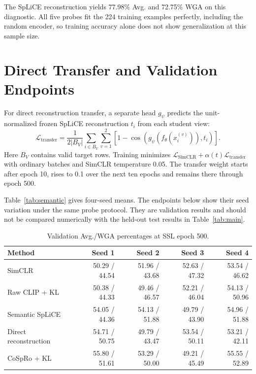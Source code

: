 \documentclass{article}
\begin{document}
The SpLiCE reconstruction yields 77.98\% Avg. and 72.75\% WGA on this diagnostic. All five probes fit the 224 training examples perfectly, including the random encoder, so training accuracy alone does not show generalization at this sample size.

\section{Direct Transfer and Validation Endpoints}
\label{app:direct}
\label{app:validation}

For direct reconstruction transfer, a separate head $g_\psi$ predicts the
unit-normalized frozen SpLiCE reconstruction $t_i$ from each student view:
\begin{equation}
 \mathcal{L}_{\mathrm{transfer}}=
 \frac{1}{2|B_V|}\sum_{i\in B_V}\sum_{v=1}^{2}
 \left[1-\cos\!\left(g_\psi(f_\theta(x_i^{(v)})),t_i\right)\right].
\end{equation}
Here $B_V$ contains valid target rows. Training minimizes
$\mathcal{L}_{\mathrm{SimCLR}}+\alpha(t)\mathcal{L}_{\mathrm{transfer}}$
with ordinary batches and SimCLR temperature 0.05. The transfer weight starts
after epoch 10, rises to 0.1 over the next ten epochs and remains there
through epoch 500.

Table~\ref{tab:semantic} gives four-seed means. The endpoints below show
their seed variation under the same probe protocol. They are validation
results and should not be compared numerically with the held-out test
results in Table~\ref{tab:main}.

\begin{table}[htbp]
\centering\small
\caption{Validation Avg./WGA percentages at SSL epoch 500.}
\begin{tabular}{lrrrr}
\toprule
Method & Seed 1 & Seed 2 & Seed 3 & Seed 4 \\
\midrule
SimCLR & 50.29 / 44.54 & 51.96 / 43.68 & 52.63 / 47.32 & 53.54 / 46.62 \\
Raw CLIP + KL & 50.38 / 44.33 & 49.46 / 46.57 & 52.21 / 46.04 & 54.13 / 50.96 \\
Semantic SpLiCE & 54.05 / 44.36 & 54.13 / 51.88 & 49.79 / 43.90 & 54.96 / 51.88 \\
Direct reconstruction & 54.71 / 50.75 & 49.79 / 43.47 & 53.54 / 50.11 & 53.21 / 42.11 \\
CoSpRo + KL & 55.80 / 51.61 & 53.29 / 50.00 & 49.21 / 45.49 & 55.55 / 52.89 \\
\bottomrule
\end{tabular}
\end{table}
\end{document}
